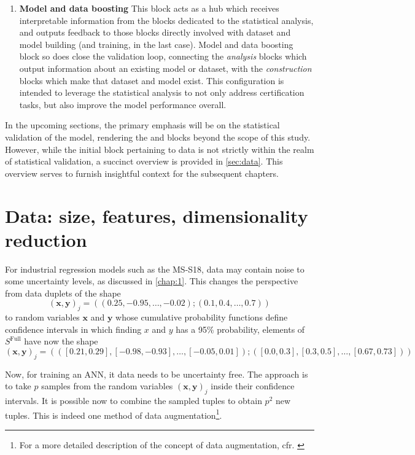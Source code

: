 \begin{enumerate}
	\item\label{item:boosting}\textbf{Model and data boosting}
	This block acts as a hub which receives interpretable information from the blocks dedicated to the statistical analysis, and outputs feedback to those blocks directly involved with dataset and model building (and training, in the last case). Model and data boosting block so does close the validation loop, connecting the \textit{analysis} blocks which output information about an existing model or dataset, with the \textit{construction} blocks which make that dataset and model exist.
	This configuration is intended to leverage the statistical analysis to not only address certification tasks, but also improve the model performance overall.\\
\end{enumerate}
%
In the upcoming sections, the primary emphasis will be on the statistical validation of the model, rendering the  and  blocks beyond the scope of this study. However, while the initial block pertaining to data is not strictly within the realm of statistical validation, a succinct overview is provided in \autoref{sec:data}. This overview serves to furnish insightful context for the subsequent chapters.

\clearpage
\section{Data: size, features, dimensionality reduction}\label{sec:data}
For industrial regression models such as the MS-S18, data may contain noise to some uncertainty levels, as discussed in \autoref{chap:1}. This changes the perspective from data duplets of the shape
$$
(\mathbf{x},\mathbf{y})_j=((0.25,-0.95,\ldots,-0.02);(0.1,0.4,\ldots,0.7))
$$ to random variables $\mathbf{x}$ and $\mathbf{y}$ whose cumulative probability functions define confidence intervals in which finding $x$ and $y$ has a 95\% probability, \ie elements of $S^\text{Full}$ have now the shape
$$
(\mathbf{x},\mathbf{y})_j=(([0.21,0.29],[-0.98,-0.93],\ldots,[-0.05,0.01]);([0.0,0.3],[0.3,0.5],\ldots,[0.67,0.73]))
$$

Now, for training an ANN, it data needs to be uncertainty free. The approach is to take $p$ samples from the random variables $(\mathbf{x},\mathbf{y})_j$ inside their confidence intervals. It is possible now to combine the sampled tuples to obtain $p^2$ new tuples. This is indeed one method of data augmentation\footnote{For a more detailed description of the concept of data augmentation, cfr. \cite{taylor2018improving}}.

